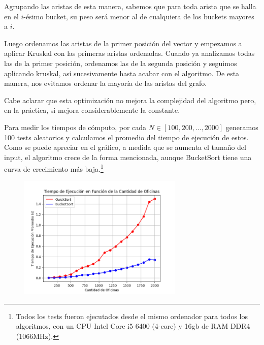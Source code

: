 \vspace{1em}

Agrupando las aristas de esta manera, sabemos que para toda arista que se halla en el $i$-ésimo bucket, su peso será menor al de cualquiera de los buckets mayores a $i$.

\vspace{1em}

Luego ordenamos las aristas de la primer posición del vector y empezamos a aplicar Kruskal con las primeras aristas ordenadas. Cuando ya analizamos todas las de la primer posición, ordenamos las de la segunda posición y seguimos aplicando kruskal, así sucesivamente hasta acabar con el algoritmo. De esta manera, nos evitamos ordenar la mayoría de las aristas del grafo.

\vspace{1em}

Cabe aclarar que esta optimización no mejora la complejidad del algoritmo pero, en la práctica, si mejora considerablemente la constante. 

\vspace{1em}
Para medir los tiempos de cómputo, por cada $N \in [100, 200,..., 2000]$ generamos 100 tests aleatorios y calculamos el promedio del tiempo de ejecución de estos. Como se puede apreciar en el gráfico, a medida que se aumenta el tamaño del input, el algoritmo crece de la forma mencionada, aunque BucketSort tiene una curva de crecimiento más baja.\footnote{Todos los tests fueron ejecutados desde el mismo ordenador para todos los algoritmos, con un CPU Intel Core i5 6400 (4-core) y 16gb de RAM DDR4 (1066MHz).}


\begin{figure}[h]
    \centering
    \includegraphics[width=0.7\textwidth, trim=0 0 0 10]{./grafico.png}
    \label{grafico}
\end{figure}

